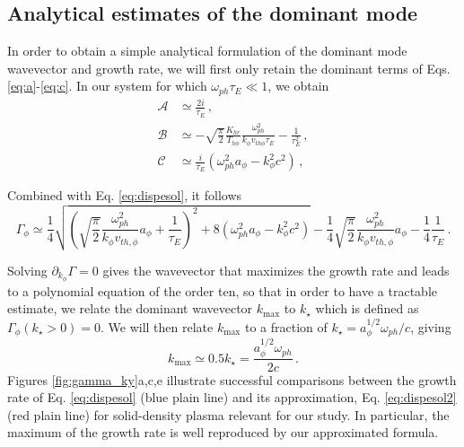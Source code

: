 \documentclass[aps,showpacs,superscriptaddress]{revtex4}
\begin{document}
\subsection{Analytical estimates of the dominant mode}

In order to obtain a simple analytical formulation of the dominant mode wavevector and growth rate, we will first only retain the dominant terms of Eqs. \eqref{eq:a}-\eqref{eq:c}. In our system for which $\omega_{ph} \tau_E \ll 1$, we obtain
\begin{align}
\mathcal{A} & \simeq \frac{2i}{\tau_E}  \label{eq:a2} \, , \\
\mathcal{B} & \simeq    - \sqrt{\frac{\pi}{2}}\frac{K_{hr} }{T_{h\phi}}\frac{\omega_{ph}^2}{k_\phi v_{th\phi} \tau_E}
 -\frac{1}{\tau_E^2 }  \, , \label{eq:b2} \\
\mathcal{C} & \simeq \frac{i}{\tau_E}(\omega_{ph}^2 a_\phi -k_\phi^2c^2 )\label{eq:c2}\, , 
\end{align}

Combined with Eq. \eqref{eq:dispesol}, it follows
\begin{equation}
\Gamma_\phi  \simeq \frac{1}{4}  \sqrt{ \left( \sqrt{\frac{\pi}{2}} \frac{\omega_{ph}^2}{k_\phi v_{th,\phi}}a_\phi    + \frac{1}{\tau_E} \right)^2 +  8(\omega_{ph}^2 a_\phi  - k_\phi^2 c^2 )   }  -\frac{1}{4}   \sqrt{\frac{\pi}{2}} \frac{\omega_{ph}^2}{k_\phi v_{th,\phi}}a_\phi    -\frac{1}{4}   \frac{1}{\tau_E}
\label{eq:dispesol2}\, .
\end{equation}

 Solving $\partial_{k_\phi} \Gamma = 0 $ gives the wavevector that maximizes the growth rate and leads to a polynomial equation of the order ten, so that in order to have a tractable estimate, we relate the dominant wavevector $k_\mathrm{max}$ to $k_\star$ which is defined as $\Gamma_\phi (k_\star>0)=0$. We will then relate $k_\mathrm{max}$ to a fraction of $k_\star =  a_\phi^{1/2}\omega_{ph}/c$, giving 
\begin{equation}\label{eq:ksat}
k_\mathrm{max} \simeq 0.5 k_\star = \frac{a_\phi^{1/2}\omega_{ph}}{2c} \, .
\end{equation}
Figures \ref{fig:gamma_ky}a,c,e  illustrate successful comparisons between the growth rate of Eq. \eqref{eq:dispesol} (blue plain line) and its approximation, Eq. \eqref{eq:dispesol2}  (red plain line) for  solid-density plasma relevant for our study. In particular, the maximum of the growth rate is well reproduced by our approximated formula.
\end{document}
